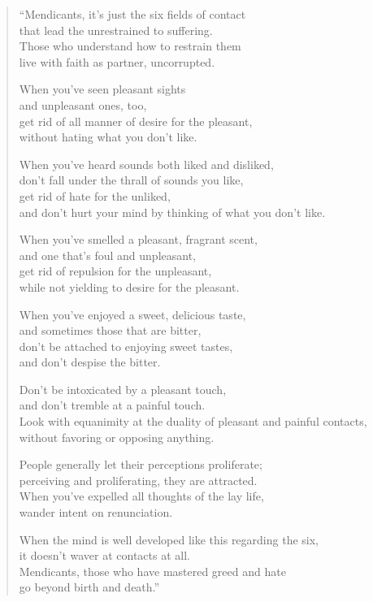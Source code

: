 \documentclass[12pt,openany]{book}%
\begin{document}
\begin{verse}%
“Mendicants, it’s just the six fields of contact \\
that lead the unrestrained to suffering. \\
Those who understand how to restrain them \\
live with faith as partner, uncorrupted. 

When you’ve seen pleasant sights \\
and unpleasant ones, too, \\
get rid of all manner of desire for the pleasant, \\
without hating what you don’t like. 

When you’ve heard sounds both liked and disliked, \\
don’t fall under the thrall of sounds you like, \\
get rid of hate for the unliked, \\
and don’t hurt your mind by thinking of what you don’t like. 

When you’ve smelled a pleasant, fragrant scent, \\
and one that’s foul and unpleasant, \\
get rid of repulsion for the unpleasant, \\
while not yielding to desire for the pleasant. 

When you’ve enjoyed a sweet, delicious taste, \\
and sometimes those that are bitter, \\
don’t be attached to enjoying sweet tastes, \\
and don’t despise the bitter. 

Don’t be intoxicated by a pleasant touch, \\
and don’t tremble at a painful touch. \\
Look with equanimity at the duality of pleasant and painful contacts, \\
without favoring or opposing anything. 

People generally let their perceptions proliferate; \\
perceiving and proliferating, they are attracted. \\
When you’ve expelled all thoughts of the lay life, \\
wander intent on renunciation. 

When the mind is well developed like this regarding the six, \\
it doesn’t waver at contacts at all. \\
Mendicants, those who have mastered greed and hate \\
go beyond birth and death.” 

%
\end{verse}
\end{document}
